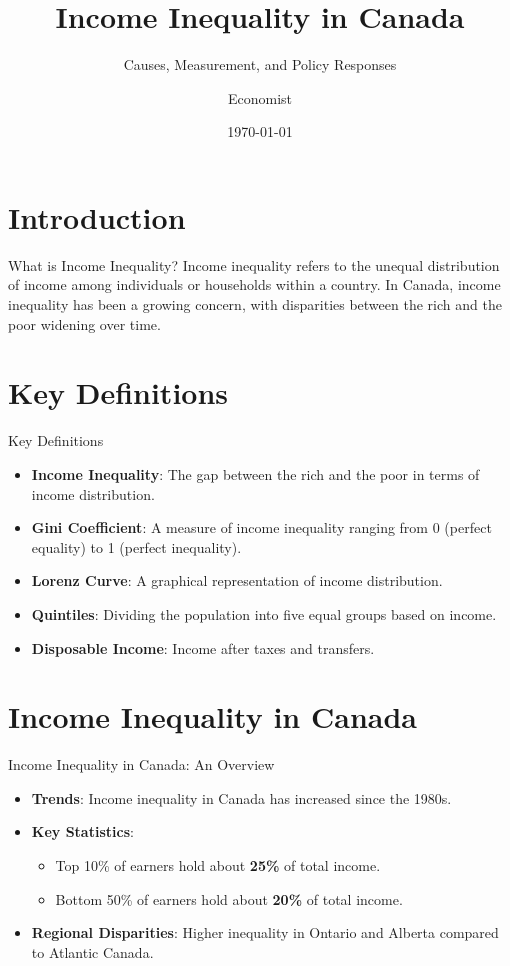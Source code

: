 \documentclass{beamer}
\title{Income Inequality in Canada}
\subtitle{Causes, Measurement, and Policy Responses}
\author{Economist}
\institute{Macroeconomics 101}
\date{\today}
\begin{document}
\begin{frame}
\titlepage
\end{frame}

\section{Introduction}

\begin{frame}{What is Income Inequality?}
Income inequality refers to the unequal distribution of income among individuals or households within a country. In Canada, income inequality has been a growing concern, with disparities between the rich and the poor widening over time.
\end{frame}

\section{Key Definitions}

\begin{frame}{Key Definitions}
\begin{itemize}
    \item \textbf{Income Inequality}: The gap between the rich and the poor in terms of income distribution.
    \item \textbf{Gini Coefficient}: A measure of income inequality ranging from 0 (perfect equality) to 1 (perfect inequality).
    \item \textbf{Lorenz Curve}: A graphical representation of income distribution.
    \item \textbf{Quintiles}: Dividing the population into five equal groups based on income.
    \item \textbf{Disposable Income}: Income after taxes and transfers.
\end{itemize}
\end{frame}

\section{Income Inequality in Canada}

\begin{frame}{Income Inequality in Canada: An Overview}
\begin{itemize}
    \item \textbf{Trends}: Income inequality in Canada has increased since the 1980s.
    \item \textbf{Key Statistics}:
        \begin{itemize}
            \item Top 10\% of earners hold about \textbf{25\%} of total income.
            \item Bottom 50\% of earners hold about \textbf{20\%} of total income.
        \end{itemize}
    \item \textbf{Regional Disparities}: Higher inequality in Ontario and Alberta compared to Atlantic Canada.
\end{itemize}
\end{frame}
\end{document}
